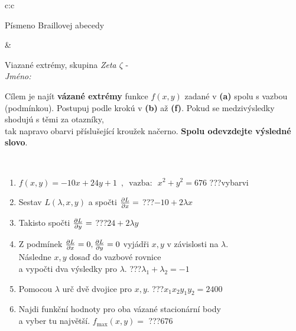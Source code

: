 \documentclass[10pt]{report}
\begin{document}
\begin{tabular}{c:c}
\begin{minipage}[c][104.5mm][t]{0.5\linewidth}
\begin{center}
\begin{minipage}{0.20\linewidth}
\begin{center}
{\small Písmeno Braillovej abecedy}
\end{center}
\end{minipage}
\end{center}
\end{minipage}
&
\begin{minipage}[c][104.5mm][t]{0.5\linewidth}
\begin{center}
\vspace{7mm}
{\huge Viazané extrémy, skupina \textit{Zeta $\zeta$} -}\\[5mm]
\textit{Jméno:}\phantom{xxxxxxxxxxxxxxxxxxxxxxxxxxxxxxxxxxxxxxxxxxxxxxxxxxxxxxxxxxxxxxxxx}\\[5mm]
\begin{minipage}{0.95\linewidth}
\begin{center}
Cílem je najít \textbf{vázané extrémy} funkce $f(x,y)$ zadané v \textbf{(a)} spolu s vazbou (podmínkou). Postupuj podle krokú v \textbf{(b)} až \textbf{(f)}. Pokud se medzivýsledky shodujú s těmi za otazníky,\\tak napravo obarvi příslušející kroužek načerno. \textbf{Spolu odevzdejte výsledné slovo}.
\end{center}
\end{minipage}
\\[1mm]
\begin{minipage}{0.79\linewidth}
\begin{center}
\begin{varwidth}{\linewidth}
\begin{enumerate}
\normalsize
\item $f(x,y)=-10x+24y+1 \enspace , \enspace \mathrm{vazba:} \enspace x^2+y^2=676$\quad \dotfill\; ???\;\dotfill \quad vybarvi
\item Sestav $L(\lambda,x,y)$ a spočti $\pdv{L}{x}=$\quad \dotfill\; ???\;\dotfill \quad $-10+2\lambda x$
\item Takisto spočti $\pdv{L}{y}=$\quad \dotfill\; ???\;\dotfill \quad $24+2\lambda y$
\item Z podmínek $\pdv{L}{x}=0 , \pdv{L}{y}=0$ vyjádři $x,y$ v závislosti na $\lambda$.\\ \phantom{xxxxxx}Následne $x,y$ dosaď do vazbové rovnice\\ \phantom{xxxxxx}a vypočti dva výsledky pro $\lambda$.\quad \dotfill\; ???\;\dotfill \quad $\lambda_1+\lambda_2=-1$
\item Pomocou $\lambda$ urč dvě dvojice pro $x,y$.\quad \dotfill\; ???\;\dotfill \quad $x_1 x_2 y_1 y_2=2400$
\item Najdi funkční hodnoty pro oba vázané stacionární body\\ \phantom{xxxxxx}a vyber tu najvětší. $f_{\text{max}}(x,y)=$\quad \dotfill\; ???\;\dotfill \quad $676$

\end{enumerate}
\end{varwidth}
\end{center}
\end{minipage}
\end{center}
\end{minipage}
\end{tabular}
\end{document}
